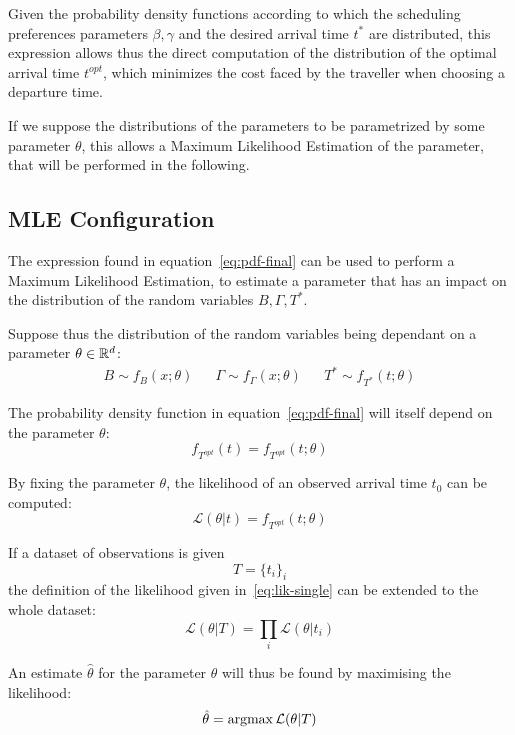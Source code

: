 Given the probability density functions according to which the scheduling preferences parameters \(\beta, \gamma\) and the desired arrival time \(t^*\) are distributed,
this expression allows thus the direct computation of the distribution of the optimal arrival time \(t^{opt}\),
which minimizes the cost faced by the traveller when choosing a departure time.

If we suppose the distributions of the parameters to be parametrized by some parameter \(\theta\),
this allows a Maximum Likelihood Estimation of the parameter,
that will be performed in the following.

\subsection{MLE Configuration}

The expression found in equation~\eqref{eq:pdf-final} can be used to perform a Maximum Likelihood Estimation,
to estimate a parameter that has an impact on the distribution of the random variables \(B, \Gamma, T^*\).

Suppose thus the distribution of the random variables being dependant on a parameter \(\theta \in \mathbb{R}^d\):
\begin{align*}
  B \sim f_B(x; \theta) && \Gamma \sim f_\Gamma(x; \theta) && T^* \sim f_{T^*}(t; \theta)
\end{align*}

The probability density function in equation~\eqref{eq:pdf-final} will itself depend on the parameter \(\theta\):
\begin{equation*}
  f_{T^{opt}}(t) = f_{T^{opt}}(t; \theta)
\end{equation*}

By fixing the parameter \(\theta\),
the likelihood of an observed arrival time \(t_0\) can be computed:
\begin{equation}
  \label{eq:lik-single}
  \mathcal{L}(\theta | t) = f_{T^{opt}}(t; \theta)
\end{equation}

If a dataset of observations is given
\begin{equation*}
  T = \{t_i\}_i
\end{equation*}
the definition of the likelihood given in~\eqref{eq:lik-single} can be extended to the whole dataset:
\begin{equation}
  \label{eq:lik-final}
  \mathcal{L}(\theta | T) = \prod_i \mathcal{L}(\theta | t_i)
\end{equation}

An estimate \(\hat{\theta}\) for the parameter \(\theta\) will thus be found by maximising the likelihood:
\begin{equation}
  \label{eq:max-lik}
  \hat{\theta} = \operatorname*{argmax} \mathcal{L}(\theta | T)
\end{equation}

